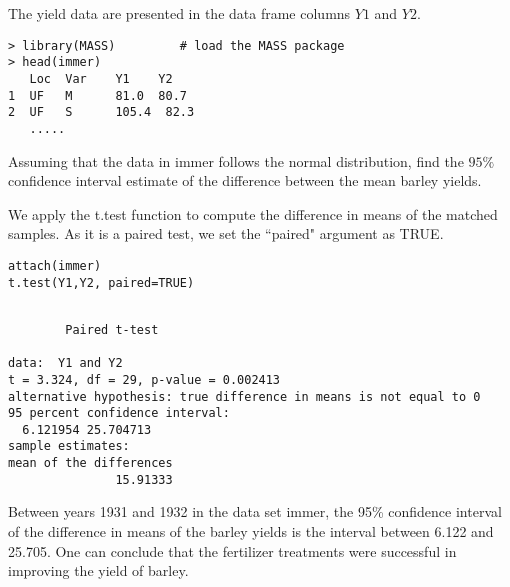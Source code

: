 The yield data are presented in the data frame columns $Y1$ and $Y2$.

\begin{verbatim}
> library(MASS)         # load the MASS package
> head(immer)
   Loc  Var    Y1    Y2
1  UF   M      81.0  80.7
2  UF   S      105.4  82.3
   .....
\end{verbatim}
Assuming that the data in immer follows the normal distribution, find the $95\%$ confidence interval estimate of the difference between the mean barley yields.

We apply the t.test function to compute the difference in means of the matched samples. As it is a paired test, we set the ``paired" argument as TRUE.

\begin{framed}
\begin{verbatim}
attach(immer)
t.test(Y1,Y2, paired=TRUE)
\end{verbatim}
\end{framed}

\begin{verbatim}

        Paired t-test

data:  Y1 and Y2
t = 3.324, df = 29, p-value = 0.002413
alternative hypothesis: true difference in means is not equal to 0
95 percent confidence interval:
  6.121954 25.704713
sample estimates:
mean of the differences
               15.91333
\end{verbatim}
Between years 1931 and 1932 in the data set immer, the 95\% confidence interval of the difference in means of the barley yields is the interval between 6.122 and 25.705.
One can conclude that the fertilizer treatments were successful in improving the yield of barley.


